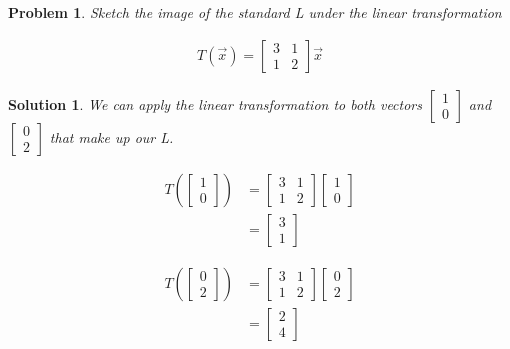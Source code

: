 \documentclass{article}
\newtheorem{problem}{Problem}
\newtheorem*{solution}{Solution}
\begin{document}
\begin{problem}
Sketch the image of the standard L under the linear transformation 

\begin{align*}
T(\vec{x}) = \begin{bmatrix} 3 & 1 \\ 1 & 2 \end{bmatrix} \vec{x}
\end{align*}
\end{problem}

\begin{solution}
We can apply the linear transformation to both vectors $\begin{bmatrix} 1 \\ 0 \end{bmatrix}$ and $\begin{bmatrix} 0 \\ 2 \end{bmatrix}$ that make up our L.

\begin{align*}
T\left(\begin{bmatrix} 1 \\ 0 \end{bmatrix}\right) &= \begin{bmatrix} 3 & 1 \\ 1 & 2 \end{bmatrix} \begin{bmatrix} 1 \\ 0 \end{bmatrix} \\
&= \begin{bmatrix} 3 \\ 1 \end{bmatrix}
\end{align*}

\begin{align*}
T\left(\begin{bmatrix} 0 \\ 2 \end{bmatrix}\right) &= \begin{bmatrix} 3 & 1 \\ 1 & 2 \end{bmatrix} \begin{bmatrix} 0 \\ 2 \end{bmatrix} \\
&= \begin{bmatrix} 2 \\ 4 \end{bmatrix}
\end{align*}


\end{solution}
\end{document}

